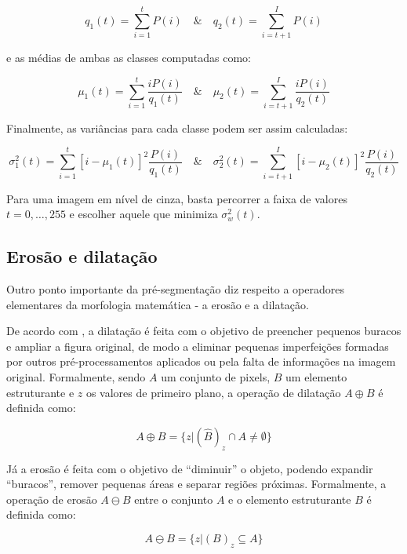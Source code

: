\documentclass[
	12pt,				%
	oneside,			%
	a4paper,			%
	sumario=tradicional,
	english,			%
	french,				%
	spanish,			%
	brazil,				%
]{abntex2}
\begin{document}
\[
q_1(t) = \sum_{i=1}^{t} P(i) \quad \& \quad q_2(t) = \sum_{i=t+1}^{I} P(i)
\]

\noindent e as médias de ambas as classes computadas como:

\[
\mu_1(t) = \sum_{i=1}^{t} \frac{iP(i)}{q_1(t)} \quad \& \quad \mu_2(t) = \sum_{i=t+1}^{I} \frac{iP(i)}{q_2(t)}
\]

Finalmente, as variâncias para cada classe podem ser assim calculadas: 

\[
\sigma_1^2(t) = \sum_{i=1}^{t} [i-\mu_1(t)]^2 \frac{P(i)}{q_1(t)} \quad \& \quad \sigma_2^2(t) = \sum_{i=t+1}^{I} [i-\mu_2(t)]^2 \frac{P(i)}{q_2(t)}
\]

Para uma imagem em nível de cinza, basta percorrer a faixa de valores $t=0,\dots,255$ e escolher aquele que minimiza  $\sigma_w^2(t)$.

\subsection{Erosão e dilatação}

Outro ponto importante da pré-segmentação diz respeito a operadores elementares da morfologia matemática \cite{serra} - a erosão e a dilatação.

De acordo com , a dilatação é feita com o objetivo de preencher pequenos buracos e ampliar a figura original, de modo a eliminar pequenas imperfeições formadas por outros pré-processamentos aplicados ou pela falta de informações na imagem original. Formalmente, sendo $A$ um conjunto de pixels, $B$ um elemento estruturante e $z$ os valores de primeiro plano, a operação de dilatação $A \oplus B$ é definida como:

\[
A \oplus B = \{z | (\hat{B})_z \cap A \neq \emptyset\}
\]

Já a erosão é feita com o objetivo de ``diminuir'' o objeto, podendo expandir ``buracos'', remover pequenas áreas e separar regiões próximas. Formalmente, a operação de erosão $A \ominus B$ entre o conjunto $A$ e o elemento estruturante $B$ é definida como:

\[
A \ominus B = \{z | (B)_z \subseteq A\}
\]

\end{document}
